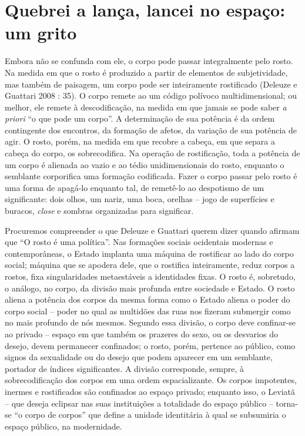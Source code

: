 \section{Quebrei a lança, lancei no espaço: um grito}

Embora não se confunda com ele, o corpo pode passar integralmente pelo
rosto. Na medida em que o rosto é produzido a partir de elementos de
subjetividade, mas também de paisagem, um corpo pode ser inteiramente
rostificado (Deleuze e Guattari 2008 : 35). O corpo remete ao um código
polívoco multidimensional; ou melhor, ele remete à descodificação, na
medida em que jamais se pode saber \emph{a priori} ``o que pode um
corpo''. A determinação de sua potência é da ordem contingente dos
encontros, da formação de afetos, da variação de sua potência de agir. O
rosto, porém, na medida em que recobre a cabeça, em que separa a cabeça
do corpo, os sobrecodifica. Na operação de rostificação, toda a potência
de um corpo é alienada ao vazio e ao tédio unidimensionais do rosto,
enquanto o semblante corporifica uma formação codificada. Fazer o corpo
passar pelo rosto é uma forma de apagá-lo enquanto tal, de remetê-lo ao
despotismo de um significante: dois olhos, um nariz, uma boca, orelhas
-- jogo de superfícies e buracos, \emph{close} e sombras organizadas
para significar.

Procuremos compreender o que Deleuze e Guattari querem dizer quando
afirmam que ``O rosto é uma política''. Nas formações sociais ocidentais
modernas e contemporâneas, o Estado implanta uma máquina de rostificar
ao lado do corpo social; máquina que se apodera dele, que o rostifica
inteiramente, reduz corpos a rostos, fixa singularidades metaestáveis a
identidades fixas. O rosto é, sobretudo, o análogo, no corpo, da divisão
mais profunda entre sociedade e Estado. O rosto aliena a potência dos
corpos da mesma forma como o Estado aliena o poder do corpo social --
poder no qual as multidões das ruas nos fizeram submergir como no mais
profundo de nós mesmos. Segundo essa divisão, o corpo deve confinar-se
ao privado -- espaço em que também os prazeres do sexo, ou os desvarios
do desejo, devem permanecer confinados; o rosto, porém, pertence ao
público, como signos da sexualidade ou do desejo que podem aparecer em
um semblante, portador de índices significantes. A divisão corresponde,
sempre, à sobrecodificação dos corpos em uma ordem espacializante. Os
corpos impotentes, inermes e rostificados são confinados ao espaço
privado; enquanto isso, o Leviatã -- que deseja eclipsar nas suas
instituições a totalidade do espaço público -- torna-se ``o corpo de
corpos'' que define a unidade identitária à qual se subsumiria o espaço
público, na modernidade.

